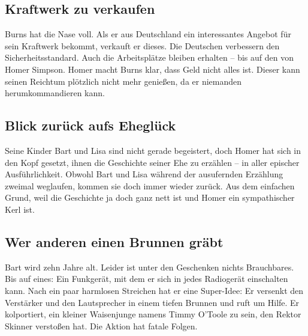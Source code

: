 	
\subsection{Kraftwerk zu verkaufen}\label{8F09}
Burns hat die Nase voll. Als er aus Deutschland ein interessantes Angebot für sein Kraftwerk bekommt, verkauft er dieses. Die Deutschen verbessern den Sicherheitsstandard. Auch die Arbeitsplätze bleiben erhalten -- bis auf den von Homer Simpson. Homer macht Burns klar, dass Geld nicht alles ist. Dieser kann seinen Reichtum plötzlich nicht mehr genießen, da er niemanden herumkommandieren kann.


	
\subsection{Blick zurück aufs Eheglück}\label{8F10}
Seine Kinder Bart und Lisa sind nicht gerade begeistert, doch Homer hat sich in den Kopf gesetzt, ihnen die Geschichte seiner Ehe zu erzählen -- in aller epischer Ausführlichkeit. Obwohl Bart und Lisa während der ausufernden Erzählung zweimal weglaufen, kommen sie doch immer wieder zurück. Aus dem einfachen Grund, weil die Geschichte ja doch ganz nett ist und Homer ein sympathischer Kerl ist.


	
\subsection{Wer anderen einen Brunnen gräbt}\label{8F11}
Bart wird zehn Jahre alt. Leider ist unter den Geschenken nichts Brauchbares. Bis auf eines: Ein Funkgerät, mit dem er sich in jedes Radiogerät einschalten kann. Nach ein paar harmlosen Streichen hat er eine Super-Idee: Er versenkt den Verstärker und den Lautsprecher in einem tiefen Brunnen und ruft um Hilfe. Er kolportiert, ein kleiner Waisenjunge namens Timmy O'Toole zu sein, den Rektor Skinner verstoßen hat. Die Aktion hat fatale Folgen.

